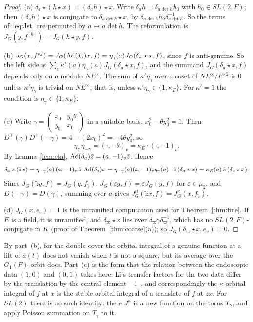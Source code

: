 \begin{proof}
(a) $\delta_a\star(h\star x)=(\delta_ah)\star x$. Write
$\delta_ah=\delta_{a\det h}h_0$ with $h_0\in SL(2,F)$; then $(\delta_ah)
\star x$ is conjugate to $\delta_{a\det h}\star x$, by
$\delta_{a\det h}h_0\delta_{a\det h}^{-1}$. So the terms of~\eqref{eq:Jst}
are permuted by $a\mapsto a\det h$. The reformulation is
$J_G(y,f^{[h]})=J_G(h\star y,f)$.

(b) $J_G(x,f^{\delta_a})=J_G(\operatorname{Ad}(\delta_a)x,f)=\eta_\gamma(a)
J_G(\delta_a\star x,f)$, since $f$ is anti-genuine. So the left side is
$\sum_a\kappa'(a)\eta_\gamma(a)J_G(\delta_a\star x,f)$, and the summand
$J_G(\delta_a\star x,f)$ depends only on $a$ modulo $N E^\times$. The sum
of $\kappa'\eta_\gamma$ over a coset of $N E^\times/F^{\times2}$ is $0$
unless $\kappa'\eta_\gamma$ is trivial on $N E^\times$, that is, unless
$\kappa'\eta_\gamma\in\{1,\kappa_E\}$. For $\kappa'=1$ the condition is
$\eta_\gamma\in\{1,\kappa_E\}$.

(c) Write $\gamma=\begin{pmatrix}x_0&y_0\theta\\y_0&x_0\end{pmatrix}$ in a
suitable basis, $x_0^2-\theta y_0^2=1$. Then
$D^+(\gamma)D^+(-\gamma)=4-(2x_0)^2=-4\theta y_0^2$, so
\begin{equation}\label{eq:eta-minus}
\eta_\gamma\,\eta_{-\gamma}=(\cdot,-\theta)_v=\kappa_E\cdot(\cdot,-1)_v .
\end{equation}
By Lemma~\ref{lem:eta}, $\operatorname{Ad}(\delta_a)\tilde z=(a,-1)_v\tilde z$.
Hence
\[
\delta_a\star(\tilde zx)=\eta_{-\gamma}(a)\,(a,-1)_v\,\tilde z\,
\operatorname{Ad}(\delta_a)x=\eta_{-\gamma}(a)(a,-1)_v\eta_\gamma(a)\cdot
\tilde z\,(\delta_a\star x)=\kappa_E(a)\,\tilde z\,(\delta_a\star x).
\]
Since $J_G(\tilde zy,f)=J_G(y,f_{\tilde z})$, $J_G(\varepsilon y,f)=
\varepsilon J_G(y,f)$ for $\varepsilon\in\mu_2$, and $D(-\gamma)=D(\gamma)$,
summing over $a$ gives $J^{\mathrm{st}}_G(\tilde zx,f)=J^\kappa_G(x,
f_{\tilde z})$.

(d) $J_G(x,e_v)=1$ is the unramified computation used for
Theorem~\ref{thm:fine}. If $E$ is a field, it is unramified, and
$\delta_\varpi\star x$ lies over $\delta_\varpi\gamma\delta_\varpi^{-1}$,
which has no $SL(2,F)$-conjugate in $K$ (proof of
Theorem~\ref{thm:coarse}(a)); so $J_G(\delta_\varpi\star x,e_v)=0$.
\end{proof}

By part~(b), for the double cover the
orbital integral of a genuine function at a lift of $a(t)$ does not
vanish when $t$ is not a square, but its average over the $G_1(F)$-orbit
does. Part~(c) is the form that the
relation between the endoscopic data $(1,0)$ and $(0,1)$ takes here: Li's
transfer factors for the two data differ by the translation by the
central element $-1$~\cite[\S5]{Li11}, and correspondingly the
$\kappa$-orbital integral of $f$ at $x$ is the stable orbital integral of
a translate of $f$ at $\tilde zx$. For $SL(2)$ there is no such
identity: there $J^\kappa$ is a new function on the torus $T_\gamma$, and
\cite{LL79} apply Poisson summation on $T_\gamma$ to it.

